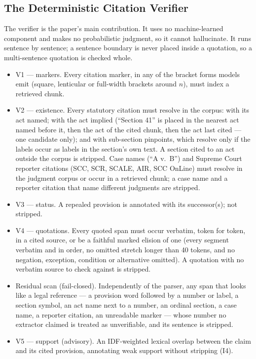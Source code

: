 \documentclass[conference]{IEEEtran}
\begin{document}
\subsection{The Deterministic Citation Verifier}
\label{ssec:verifier}

The verifier is the paper's main contribution. It uses no machine-learned component and makes no probabilistic judgment, so it cannot hallucinate. It runs sentence by sentence; a sentence boundary is never placed inside a quotation, so a multi-sentence quotation is checked whole.

\begin{itemize}
\item V1 --- markers. Every citation marker, in any of the bracket forms models emit (square, lenticular or full-width brackets around $n$), must index a retrieved chunk.
\item V2 --- existence. Every statutory citation must resolve in the corpus: with its act named; with the act implied (``Section 41'' is placed in the nearest act named before it, then the act of the cited chunk, then the act last cited --- one candidate only); and with sub-section pinpoints, which resolve only if the labels occur as labels in the section's own text. A section cited to an act outside the corpus is stripped. Case names (``A v.\ B'') and Supreme Court reporter citations (SCC, SCR, SCALE, AIR, SCC OnLine) must resolve in the judgment corpus or occur in a retrieved chunk; a case name and a reporter citation that name different judgments are stripped.
\item V3 --- status. A repealed provision is annotated with its successor(s); not stripped.
\item V4 --- quotations. Every quoted span must occur verbatim, token for token, in a cited source, or be a faithful marked elision of one (every segment verbatim and in order, no omitted stretch longer than 40 tokens, and no negation, exception, condition or alternative omitted). A quotation with no verbatim source to check against is stripped.
\item Residual scan (fail-closed). Independently of the parser, any span that looks like a legal reference --- a provision word followed by a number or label, a section symbol, an act name next to a number, an ordinal section, a case name, a reporter citation, an unreadable marker --- whose number no extractor claimed is treated as unverifiable, and its sentence is stripped.
\item V5 --- support (advisory). An IDF-weighted lexical overlap between the claim and its cited provision, annotating weak support without stripping (I4).
\end{itemize}
\end{document}
